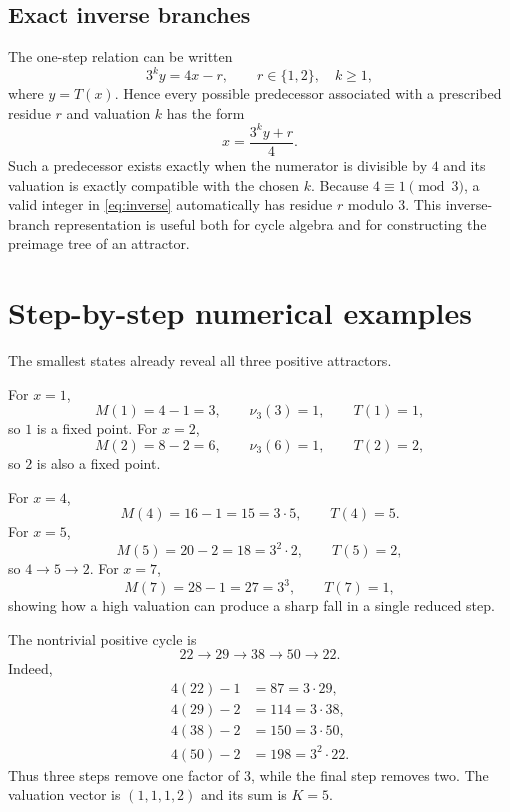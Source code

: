 \documentclass[11pt]{article}
\newcommand{\vthree}{\nu_3}
\newcommand{\Tmap}{T}
\newcommand{\Mmap}{M}
\begin{document}
\subsection{Exact inverse branches}
The one-step relation can be written
\begin{equation}
3^k y=4x-r,
\qquad r\in\{1,2\},\quad k\ge1,
\label{eq:onestep}
\end{equation}
where $y=\Tmap(x)$.  Hence every possible predecessor associated with a prescribed residue $r$ and valuation $k$ has the form
\begin{equation}
x=\frac{3^k y+r}{4}.
\label{eq:inverse}
\end{equation}
Such a predecessor exists exactly when the numerator is divisible by $4$ and its valuation is exactly compatible with the chosen $k$.  Because $4\equiv1\pmod3$, a valid integer in \eqref{eq:inverse} automatically has residue $r$ modulo $3$.  This inverse-branch representation is useful both for cycle algebra and for constructing the preimage tree of an attractor.

\section{Step-by-step numerical examples}
The smallest states already reveal all three positive attractors.

For $x=1$,
\[
\Mmap(1)=4-1=3,\qquad \vthree(3)=1,\qquad \Tmap(1)=1,
\]
so $1$ is a fixed point.  For $x=2$,
\[
\Mmap(2)=8-2=6,\qquad \vthree(6)=1,\qquad \Tmap(2)=2,
\]
so $2$ is also a fixed point.

For $x=4$,
\[
\Mmap(4)=16-1=15=3\cdot5,
\qquad \Tmap(4)=5.
\]
For $x=5$,
\[
\Mmap(5)=20-2=18=3^2\cdot2,
\qquad \Tmap(5)=2,
\]
so $4\to5\to2$.  For $x=7$,
\[
\Mmap(7)=28-1=27=3^3,
\qquad \Tmap(7)=1,
\]
showing how a high valuation can produce a sharp fall in a single reduced step.

The nontrivial positive cycle is
\begin{equation}
22\longrightarrow29\longrightarrow38\longrightarrow50\longrightarrow22.
\label{eq:fourcycle}
\end{equation}
Indeed,
\[
\begin{aligned}
4(22)-1&=87=3\cdot29,\\
4(29)-2&=114=3\cdot38,\\
4(38)-2&=150=3\cdot50,\\
4(50)-2&=198=3^2\cdot22.
\end{aligned}
\]
Thus three steps remove one factor of $3$, while the final step removes two.  The valuation vector is $(1,1,1,2)$ and its sum is $K=5$.
\end{document}
